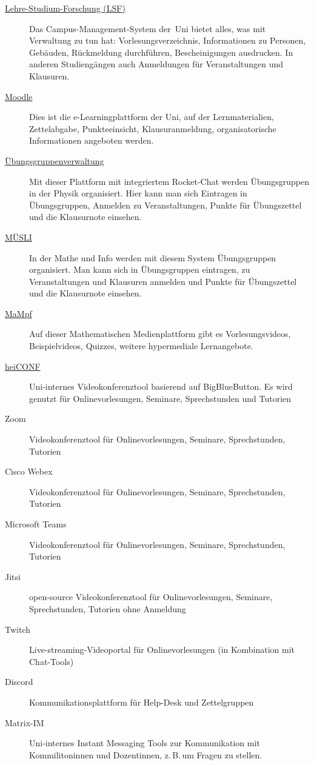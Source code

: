 \begin{description}
	\item[\href{https://lsf.uni-heidelberg.de/}{Lehre-Studium-Forschung (LSF)}] Das Campus-Management-System der~Uni bietet alles, was mit Verwaltung zu tun hat: Vorlesungsverzeichnis, Informationen zu Personen, Gebäuden, Rückmeldung durchführen, Bescheinigungen ausdrucken. In anderen Studiengängen auch Anmeldungen für Veranstaltungen und Klausuren.
	\item[\href{https://moodle.uni-heidelberg.de}{Moodle}] Dies ist die e-Learningplattform der Uni, auf der Lernmaterialien, Zettelabgabe, Punkteeinsicht, Klausuranmeldung, organisatorische Informationen angeboten werden.
	\item[\href{https://uebungen.physik.uni-heidelberg.de}{Übungsgruppenverwaltung}] Mit dieser Plattform mit integriertem Rocket-Chat werden Übungsgruppen in der Physik organisiert. Hier kann man sich Eintragen in Übungsgruppen, Anmelden zu Veranstaltungen, Punkte für Übungszettel und die Klausurnote einsehen.
	\item[\href{https://muesli.mathi.uni-heidelberg.de}{MÜSLI}] In der Mathe und Info werden mit diesem System Übungsgruppen organisiert. Man kann sich in Übungsgruppen eintragen, zu Veranstaltungen und Klausuren anmelden und Punkte für Übungszettel und die Klausurnote einsehen.
	\item[\href{https://mampf.mathi.uni-heidelberg.de}{MaMpf}] Auf dieser Mathematischen Medienplattform gibt es Vorlesungsvideos, Beispielvideos, Quizzes, weitere hypermediale Lernangebote.
	\item[\href{https://heiconf.uni-heidelberg.de}{heiCONF}] Uni-internes Videokonferenztool basierend auf BigBlueButton. Es wird genutzt für Onlinevorlesungen, Seminare, Sprechstunden und Tutorien
	\item[Zoom] Videokonferenztool für Onlinevorlesungen, Seminare, Sprechstunden, Tutorien 
	\item[Cisco Webex] Videokonferenztool für Onlinevorlesungen, Seminare, Sprechstunden, Tutorien 
	\item[Microsoft Teams] Videokonferenztool für Onlinevorlesungen, Seminare, Sprechstunden, Tutorien
	\item[Jitsi] open-source Videokonferenztool für Onlinevorlesungen, Seminare, Sprechstunden, Tutorien ohne Anmeldung
	\item[Twitch] Live-streaming-Videoportal für Onlinevorlesungen (in Kombination mit Chat-Tools)
	\item[Discord] Kommunikationsplattform für Help-Desk und Zettelgruppen 
	\item[Matrix-IM] Uni-internes Instant Messaging Tools zur Kommunikation mit Kommilitoninnen und Dozentinnen, z.\,B.\,um Fragen zu stellen.
\end{description}
		 
